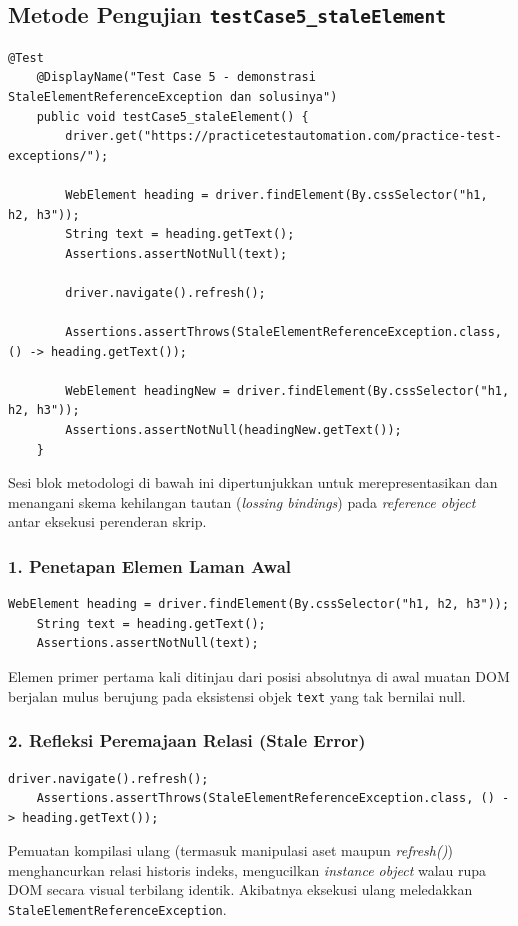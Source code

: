 \documentclass[a4paper,oneside,12pt]{report}
\begin{document}
\subsection{Metode Pengujian \texttt{testCase5\_staleElement}}
\begin{lstlisting}[style=javastyle, caption=Metode Utuh \texttt{testCase5\_staleElement}]
    @Test
    @DisplayName("Test Case 5 - demonstrasi StaleElementReferenceException dan solusinya")
    public void testCase5_staleElement() {
        driver.get("https://practicetestautomation.com/practice-test-exceptions/");

        WebElement heading = driver.findElement(By.cssSelector("h1, h2, h3"));
        String text = heading.getText();
        Assertions.assertNotNull(text);

        driver.navigate().refresh();

        Assertions.assertThrows(StaleElementReferenceException.class, () -> heading.getText());

        WebElement headingNew = driver.findElement(By.cssSelector("h1, h2, h3"));
        Assertions.assertNotNull(headingNew.getText());
    }
\end{lstlisting}
Sesi blok metodologi di bawah ini dipertunjukkan untuk merepresentasikan dan menangani skema kehilangan tautan (\textit{lossing bindings}) pada \textit{reference object} antar eksekusi perenderan skrip.

\subsubsection*{1. Penetapan Elemen Laman Awal}
\begin{lstlisting}[style=javastyle]
    WebElement heading = driver.findElement(By.cssSelector("h1, h2, h3"));
    String text = heading.getText();
    Assertions.assertNotNull(text);
\end{lstlisting}
Elemen primer pertama kali ditinjau dari posisi absolutnya di awal muatan DOM berjalan mulus berujung pada eksistensi objek \texttt{text} yang tak bernilai null.

\subsubsection*{2. Refleksi Peremajaan Relasi (Stale Error)}
\begin{lstlisting}[style=javastyle]
    driver.navigate().refresh();
    Assertions.assertThrows(StaleElementReferenceException.class, () -> heading.getText());
\end{lstlisting}
Pemuatan kompilasi ulang (termasuk manipulasi aset maupun \textit{refresh()}) menghancurkan relasi historis indeks, mengucilkan \textit{instance object} walau rupa DOM secara visual terbilang identik. Akibatnya eksekusi ulang meledakkan \texttt{StaleElementReferenceException}.
\end{document}
